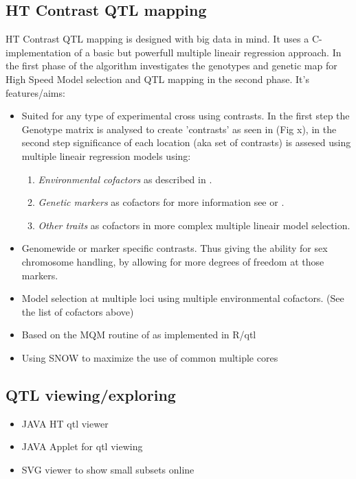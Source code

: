 \documentclass{bioinfo}
\begin{document}
\subsection*{HT Contrast QTL mapping}
  HT Contrast QTL mapping is designed with big data in mind. 
  It uses a C-implementation of a basic but powerfull multiple 
  lineair regression approach. In the first phase of the algorithm 
  investigates the genotypes and genetic map for High Speed Model 
  selection and QTL mapping in the second phase. It's features/aims:
  \begin{itemize}
  \item Suited for any type of experimental cross using contrasts. 
  In the first step the Genotype matrix is analysed to create 'contrasts' 
  as seen in (Fig x), in the second step significance of each location 
  (aka set of contrasts) is assesed using multiple lineair regression 
  models using:
  \begin{enumerate}
    \item \emph{Environmental cofactors} as described in \cite{Li:2006}.
    \item \emph{Genetic markers} as cofactors for more information see \cite{Jansen:1994a} or \cite{Handbook:2007}.
    \item \emph{Other traits} as cofactors in more complex multiple lineair model selection.
  \end{enumerate}
  \item Genomewide or marker specific contrasts. Thus giving 
        the ability for sex chromosome handling, by allowing 
        for more degrees of freedom at those markers.
  \item Model selection at multiple loci using multiple 
        environmental cofactors. (See the list of cofactors 
        above)
  \item Based on the MQM routine of \cite{Jansen:1994a} as 
        implemented in R/qtl \citep{arends:2010}
  \item Using SNOW to maximize the use of common multiple cores
  \end{itemize}
  
\subsection*{QTL viewing/exploring}
  \begin{itemize}
    \item JAVA HT qtl viewer
    \item JAVA Applet for qtl viewing
    \item SVG viewer to show small subsets online
  \end{itemize}
  
\end{document}
